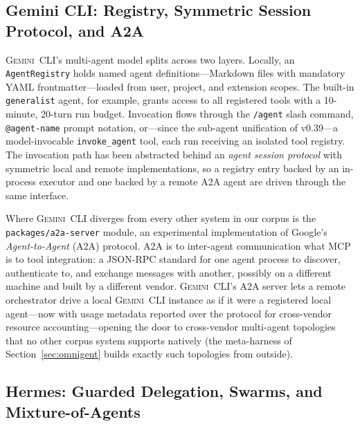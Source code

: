 \documentclass[11pt,a4paper]{article}
\newcommand{\gemini}{\textsc{Gemini~CLI}\xspace}
\begin{document}
\subsection{Gemini CLI: Registry, Symmetric Session Protocol, and A2A}

\gemini{}'s multi-agent model splits across two layers.
Locally, an \texttt{AgentRegistry} holds named agent definitions---Markdown files with mandatory YAML frontmatter---loaded from user, project, and extension scopes.
The built-in \texttt{generalist} agent, for example, grants access to all registered tools with a 10-minute, 20-turn run budget.
Invocation flows through the \texttt{/agent} slash command, \texttt{@agent-name} prompt notation, or---since the sub-agent unification of v0.39---a model-invocable \texttt{invoke\_agent} tool, each run receiving an isolated tool registry.
The invocation path has been abstracted behind an \emph{agent session protocol} with symmetric local and remote implementations, so a registry entry backed by an in-process executor and one backed by a remote A2A agent are driven through the same interface.

Where \gemini{} diverges from every other system in our corpus is the \texttt{packages/a2a-server} module, an experimental implementation of Google's \emph{Agent-to-Agent} (A2A) protocol.
A2A is to inter-agent communication what MCP is to tool integration: a JSON-RPC standard for one agent process to discover, authenticate to, and exchange messages with another, possibly on a different machine and built by a different vendor.
\gemini{}'s A2A server lets a remote orchestrator drive a local \gemini{} instance as if it were a registered local agent---now with usage metadata reported over the protocol for cross-vendor resource accounting---opening the door to cross-vendor multi-agent topologies that no other corpus system supports natively (the meta-harness of Section~\ref{sec:omnigent} builds exactly such topologies from outside).

\subsection{Hermes: Guarded Delegation, Swarms, and Mixture-of-Agents}
\end{document}
